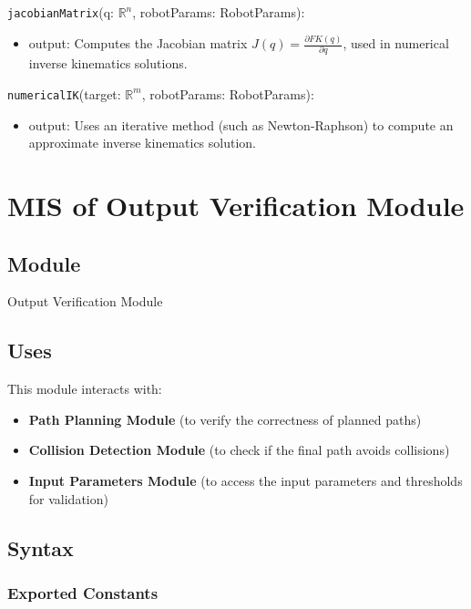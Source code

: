 \documentclass[12pt, titlepage]{article}
\begin{document}
\noindent \texttt{jacobianMatrix}(q: $\mathbb{R}^n$, robotParams: RobotParams):
\begin{itemize}
  \item output: Computes the Jacobian matrix \( J(q) = \frac{\partial FK(q)}{\partial q} \), used in numerical inverse kinematics solutions.
\end{itemize}

\noindent \texttt{numericalIK}(target: $\mathbb{R}^m$, robotParams: RobotParams):
\begin{itemize}
  \item output: Uses an iterative method (such as Newton-Raphson) to compute an approximate inverse kinematics solution.
\end{itemize}

\newpage

\section{MIS of Output Verification Module} \label{Module:OutputVerification}

\subsection{Module}

Output Verification Module

\subsection{Uses}

This module interacts with:
\begin{itemize}
    \item \textbf{Path Planning Module} (to verify the correctness of planned paths)
    \item \textbf{Collision Detection Module} (to check if the final path avoids collisions)
    \item \textbf{Input Parameters Module} (to access the input parameters and thresholds for validation)
\end{itemize}

\subsection{Syntax}

\subsubsection{Exported Constants}
\end{document}

